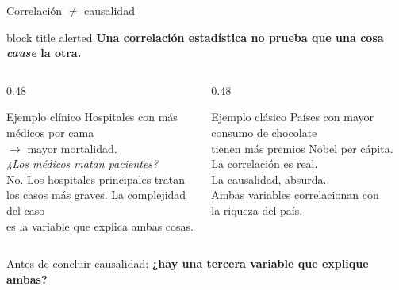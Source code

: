 \documentclass[aspectratio=169,10pt]{beamer}
\begin{document}
\begin{frame}{Correlación $\neq$ causalidad}
  \begin{center}
    {
\begin{beamercolorbox}[sep=8pt,center,rounded=true,shadow=false]{block title alerted}
\normalsize\bfseries
Una correlación estadística no prueba que una cosa \textit{cause} la otra.
\end{beamercolorbox}
}
  \end{center}
  \begin{columns}[T]
    \begin{column}{0.48\textwidth}
      \begin{block}{Ejemplo clínico}
        \small Hospitales con más médicos por cama\\
        $\rightarrow$ mayor mortalidad.\\[2mm]
        \textit{¿Los médicos matan pacientes?}\\[2mm]
        \scriptsize No. Los hospitales principales tratan\\
        los casos más graves. La complejidad del caso\\
        es la variable que explica ambas cosas.
      \end{block}
    \end{column}
    \begin{column}{0.48\textwidth}
      \begin{block}{Ejemplo clásico}
        \small Países con mayor consumo de chocolate\\
        tienen más premios Nobel per cápita.\\[2mm]
        \scriptsize La correlación es real.\\
        La causalidad, absurda.\\[1mm]
        Ambas variables correlacionan con\\
        la riqueza del país.
      \end{block}
    \end{column}
  \end{columns}
  \vspace{4mm}
  \begin{exampleblock}{\centering}
    \centering\small
    Antes de concluir causalidad: \textbf{¿hay una tercera variable que explique ambas?}
  \end{exampleblock}
\end{frame}
\end{document}
